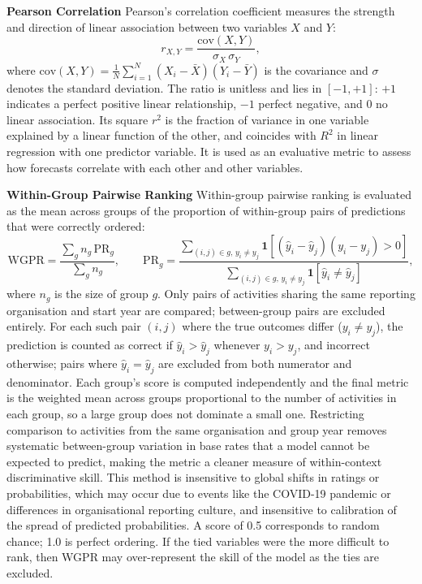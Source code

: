 \documentclass[12pt,a4paper]{article}
\begin{document}
\textbf{Pearson Correlation}
Pearson's correlation coefficient measures the strength and direction of linear association between two variables $X$ and $Y$:
\[
  r_{X,Y} = \frac{\mathrm{cov}(X, Y)}{\sigma_X\, \sigma_Y},
\]
where $\mathrm{cov}(X, Y) = \frac{1}{N}\sum_{i=1}^{N}(X_i - \bar{X})(Y_i - \bar{Y})$ is the covariance and $\sigma$ denotes the standard deviation. The ratio is unitless and lies in $[-1, +1]$: $+1$ indicates a perfect positive linear relationship, $-1$ perfect negative, and $0$ no linear association. Its square $r^2$ is the fraction of variance in one variable explained by a linear function of the other, and coincides with $R^2$ in linear regression with one predictor variable. It is used as an evaluative metric to assess how forecasts correlate with each other and other variables.

\textbf{Within-Group Pairwise Ranking}
Within-group pairwise ranking is evaluated as the mean across groups of the proportion of within-group pairs of predictions that were correctly ordered:
\[
  \mathrm{WGPR} = \frac{\sum_g n_g \, \mathrm{PR}_g}{\sum_g n_g}, \qquad \mathrm{PR}_g = \frac{\sum_{(i,j) \in g,\, y_i \neq y_j} \mathbf{1}[(\hat{y}_i - \hat{y}_j)(y_i - y_j) > 0]}{\sum_{(i,j) \in g,\, y_i \neq y_j} \mathbf{1}[\hat{y}_i \neq \hat{y}_j]},
\]
where $n_g$ is the size of group $g$. Only pairs of activities sharing the same reporting organisation and start year are compared; between-group pairs are excluded entirely. For each such pair $(i, j)$ where the true outcomes differ ($y_i \neq y_j$), the prediction is counted as correct if $\hat{y}_i > \hat{y}_j$ whenever $y_i > y_j$, and incorrect otherwise; pairs where $\hat{y}_i = \hat{y}_j$ are excluded from both numerator and denominator. Each group's score is computed independently and the final metric is the weighted mean across groups proportional to the number of activities in each group, so a large group does not dominate a small one. Restricting comparison to activities from the same organisation and group year removes systematic between-group variation in base rates that a model cannot be expected to predict, making the metric a cleaner measure of within-context discriminative skill. This method is insensitive to global shifts in ratings or probabilities, which may occur due to events like the COVID-19 pandemic or differences in organisational reporting culture, and insensitive to calibration of the spread of predicted probabilities. A score of 0.5 corresponds to random chance; 1.0 is perfect ordering. If the tied variables were the more difficult to rank, then WGPR may over-represent the skill of the model as the ties are excluded.
\end{document}
